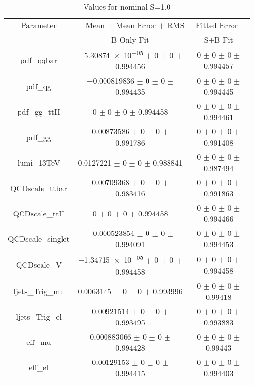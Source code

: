 \begin{table}
\centering
\caption{Values for nominal S=1.0}
\begin{tabular}{ccc}
\toprule
Parameter 	& \multicolumn{2}{c}{Mean $\pm$ Mean Error $\pm$ RMS $\pm$ Fitted Error}\\
 	& B-Only Fit & S+B Fit\\
\midrule
pdf\_qqbar 	& \num{-5.30874e-05} $\pm$ \num{0} $\pm$ \num{0} $\pm$ \num{0.994456} 	& \num{0} $\pm$ \num{0} $\pm$ \num{0} $\pm$ \num{0.994457}\\
pdf\_qg 	& \num{-0.000819836} $\pm$ \num{0} $\pm$ \num{0} $\pm$ \num{0.994435} 	& \num{0} $\pm$ \num{0} $\pm$ \num{0} $\pm$ \num{0.994445}\\
pdf\_gg\_ttH 	& \num{0} $\pm$ \num{0} $\pm$ \num{0} $\pm$ \num{0.994458} 	& \num{0} $\pm$ \num{0} $\pm$ \num{0} $\pm$ \num{0.994461}\\
pdf\_gg 	& \num{0.00873586} $\pm$ \num{0} $\pm$ \num{0} $\pm$ \num{0.991786} 	& \num{0} $\pm$ \num{0} $\pm$ \num{0} $\pm$ \num{0.991408}\\
lumi\_13TeV 	& \num{0.0127221} $\pm$ \num{0} $\pm$ \num{0} $\pm$ \num{0.988841} 	& \num{0} $\pm$ \num{0} $\pm$ \num{0} $\pm$ \num{0.987494}\\
QCDscale\_ttbar 	& \num{0.00709368} $\pm$ \num{0} $\pm$ \num{0} $\pm$ \num{0.983416} 	& \num{0} $\pm$ \num{0} $\pm$ \num{0} $\pm$ \num{0.991863}\\
QCDscale\_ttH 	& \num{0} $\pm$ \num{0} $\pm$ \num{0} $\pm$ \num{0.994458} 	& \num{0} $\pm$ \num{0} $\pm$ \num{0} $\pm$ \num{0.994466}\\
QCDscale\_singlet 	& \num{-0.000523854} $\pm$ \num{0} $\pm$ \num{0} $\pm$ \num{0.994091} 	& \num{0} $\pm$ \num{0} $\pm$ \num{0} $\pm$ \num{0.994453}\\
QCDscale\_V 	& \num{-1.34715e-05} $\pm$ \num{0} $\pm$ \num{0} $\pm$ \num{0.994458} 	& \num{0} $\pm$ \num{0} $\pm$ \num{0} $\pm$ \num{0.994458}\\
ljets\_Trig\_mu 	& \num{0.0063145} $\pm$ \num{0} $\pm$ \num{0} $\pm$ \num{0.993996} 	& \num{0} $\pm$ \num{0} $\pm$ \num{0} $\pm$ \num{0.99418}\\
ljets\_Trig\_el 	& \num{0.00921514} $\pm$ \num{0} $\pm$ \num{0} $\pm$ \num{0.993495} 	& \num{0} $\pm$ \num{0} $\pm$ \num{0} $\pm$ \num{0.993883}\\
eff\_mu 	& \num{0.000883066} $\pm$ \num{0} $\pm$ \num{0} $\pm$ \num{0.994428} 	& \num{0} $\pm$ \num{0} $\pm$ \num{0} $\pm$ \num{0.99443}\\
eff\_el 	& \num{0.00129153} $\pm$ \num{0} $\pm$ \num{0} $\pm$ \num{0.994415} 	& \num{0} $\pm$ \num{0} $\pm$ \num{0} $\pm$ \num{0.994403}\\

\end{tabular}
\end{table}
